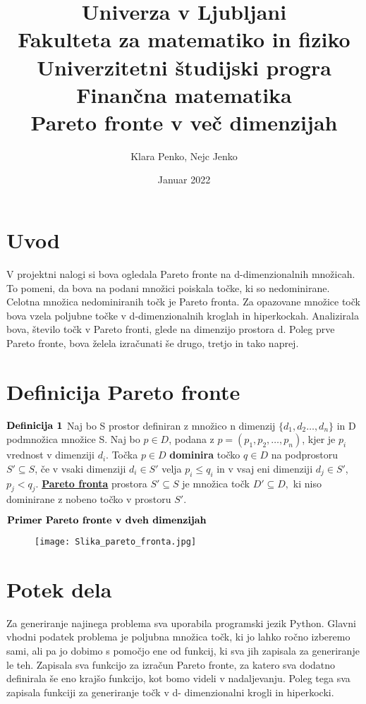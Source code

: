 \documentclass{article}
\title{
{\large{Univerza v Ljubljani}}\\ 
{\large{Fakulteta za matematiko in fiziko}}\\ 
{\large{Univerzitetni študijski progra Finančna matematika}}\\ 
\vspace{5cm}
{\textbf{Pareto fronte v več dimenzijah}
\vspace{5cm}}
}
\author{Klara Penko, Nejc Jenko}
\date{Januar 2022}
\begin{document}
\begin{titlepage}
    \maketitle
\end{titlepage}

\section{Uvod}
V projektni nalogi si bova ogledala Pareto fronte na d-dimenzionalnih množicah. To pomeni, da bova na podani množici poiskala točke, ki so nedominirane. Celotna množica nedominiranih točk je Pareto fronta.  Za opazovane množice točk bova vzela poljubne točke v d-dimenzionalnih kroglah in hiperkockah. Analizirala bova, število točk v Pareto fronti, glede na dimenzijo prostora d. Poleg prve Pareto fronte, bova želela izračunati še drugo, tretjo in tako naprej.

\section{Definicija Pareto fronte}
${\rm \textbf{Definicija 1}}$ Naj bo S prostor definiran z množico n dimenzij $\{d_{1},d_{2}\dots,d_{n}\}$ in D podmnožica množice S. Naj bo $p \in D$, podana z $p = (p_{1},p_{2},\dots,p_{n})$, kjer je $p_{i}$ vrednost v dimenziji $d_{i}$. Točka $p \in D$ \textbf{dominira} točko $q \in D$ na podprostoru $S'\subseteq S$, če v vsaki dimenziji $d_{i} \in S'$ velja $p_{i} \le q_{i}$ in v vsaj eni dimenziji $d_{j} \in S'$, $p_{j} < q_{j}$. 
\underline{\textbf{Pareto fronta}} prostora $S' \subseteq S$ je množica točk $D' \subseteq D,$ ki niso dominirane z nobeno točko v prostoru $S'$. \break
\break

${\rm \textbf{Primer Pareto fronte v dveh dimenzijah}}$

 \begin{figure}[htbp]
\texttt{[image: Slika\_pareto\_fronta.jpg]}
\centering
\end{figure}

\section{Potek dela}
Za generiranje najinega problema sva uporabila programski jezik Python. Glavni vhodni podatek problema je poljubna množica točk, ki jo lahko ročno izberemo sami, ali pa jo dobimo s pomočjo ene od funkcij, ki sva jih zapisala za generiranje le teh. Zapisala sva funkcijo za izračun Pareto fronte, za katero sva dodatno definirala še eno krajšo funkcijo, kot bomo videli v nadaljevanju. Poleg tega sva zapisala funkciji za generiranje točk v d- dimenzionalni krogli in hiperkocki.
\end{document}
